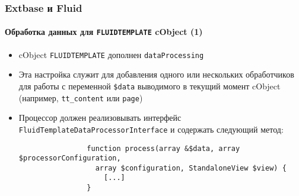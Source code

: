 \begin{frame}[fragile]
	\frametitle{Extbase и Fluid}
	\framesubtitle{Обработка данных для \texttt{FLUIDTEMPLATE} cObject (1)}

	\lstset{basicstyle=\smaller\ttfamily}

	\begin{itemize}

		\item cObject \texttt{FLUIDTEMPLATE} дополнен \texttt{dataProcessing}

		\item Эта настройка служит для добавления одного или нескольких обработчиков для
			работы с переменной \texttt{\$data} выводимого в текущий момент cObject\newline
			(например, \texttt{tt\_content} или \texttt{page})

		\item Процессор должен реализовывать интерфейс
			\texttt{FluidTemplateDataProcessorInterface} и содержать следующий метод:

			\begin{lstlisting}
				function process(array &$data, array $processorConfiguration,
				  array $configuration, StandaloneView $view) {
				    [...]
				}
			\end{lstlisting}

	\end{itemize}

\end{frame}


